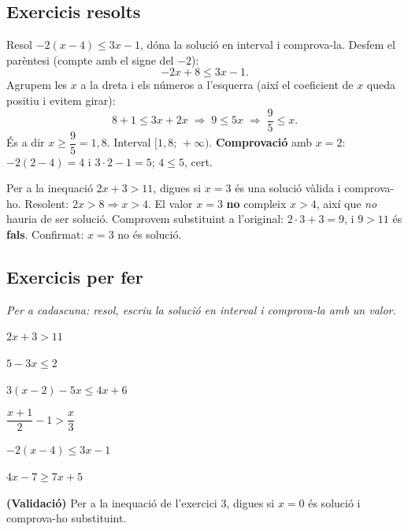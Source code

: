\subsection{Exercicis resolts}

\begin{exresolt}
Resol $-2(x-4)\le 3x-1$, dóna la solució en interval i comprova-la.
\solucio
Desfem el parèntesi (compte amb el signe del $-2$):
\[
-2x+8\le 3x-1.
\]
Agrupem les $x$ a la dreta i els números a l'esquerra (així el coeficient de $x$
queda positiu i evitem girar):
\[
8+1\le 3x+2x \;\Rightarrow\; 9\le 5x \;\Rightarrow\; \frac{9}{5}\le x.
\]
És a dir $x\ge\dfrac{9}{5}=1,8$. Interval $[1,8;\,+\infty)$. \textbf{Comprovació} amb
$x=2$: $-2(2-4)=4$ i $3\cdot 2-1=5$; $4\le 5$, cert.
\resposta{$x\ge 1,8$, interval $[1,8;\,+\infty)$.}
\end{exresolt}

\begin{exresolt}
Per a la inequació $2x+3>11$, digues si $x=3$ és una solució vàlida i comprova-ho.
\solucio
Resolent: $2x>8 \Rightarrow x>4$. El valor $x=3$ \textbf{no} compleix $x>4$, així que
\emph{no} hauria de ser solució. Comprovem substituint a l'original: $2\cdot 3+3=9$,
i $9>11$ és \textbf{fals}. Confirmat: $x=3$ no és solució.
\end{exresolt}

\subsection{Exercicis per fer}

\noindent\textit{Per a cadascuna: resol, escriu la solució en interval i comprova-la
amb un valor.}

\begin{exercicis}
\begin{exlist}
  \item $2x+3>11$
  \item $5-3x\le 2$
  \item $3(x-2)-5x\le 4x+6$
  \item $\dfrac{x+1}{2}-1>\dfrac{x}{3}$
  \item $-2(x-4)\le 3x-1$
  \item $4x-7\ge 7x+5$
  \item \textbf{(Validació)} Per a la inequació de l'exercici 3, digues si $x=0$ és
        solució i comprova-ho substituint.
\end{exlist}
\end{exercicis}

